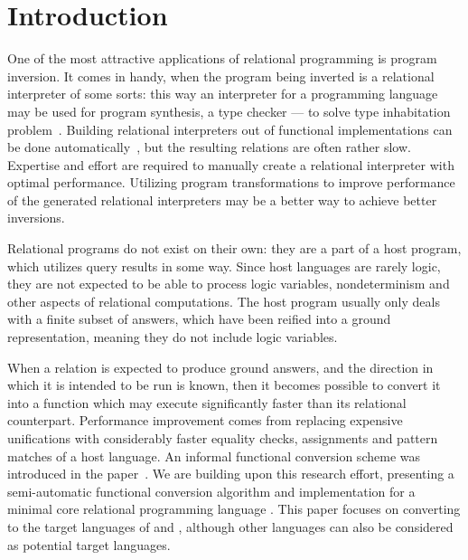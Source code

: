 \section{Introduction}
One of the most attractive applications of relational programming is program inversion.
It comes in handy, when the program being inverted is a relational interpreter of some sorts: this way an interpreter for a programming language may be used for program synthesis, a type checker --- to solve type inhabitation problem~\cite{lozov2019relational}.
Building relational interpreters out of functional implementations can be done automatically~\cite{lozov2018typed}, but the resulting relations are often rather slow.
Expertise and effort are required to manually create a relational interpreter with optimal performance.
Utilizing program transformations to improve performance of the generated relational interpreters may be a better way to achieve better inversions.

Relational programs do not exist on their own: they are a part of a host program, which utilizes query results in some way.
Since host languages are rarely logic, they are not expected to be able to process logic variables, nondeterminism and other aspects of relational computations.
The host program usually only deals with a finite subset of answers, which have been reified into a ground representation, meaning they do not include logic variables.

When a relation is expected to produce ground answers, and the direction in which it is intended to be run is known, then it becomes possible to convert it into a function which may execute significantly faster than its relational counterpart.
Performance improvement comes from replacing expensive unifications with considerably faster equality checks, assignments and pattern matches of a host language.
An informal functional conversion scheme was introduced in the paper~\cite{verbitskaia2022direction}.
We are building upon this research effort, presenting a semi-automatic functional conversion algorithm and implementation for a minimal core relational programming language \micro.
This paper focuses on converting to the target languages of \haskell and \ocaml, although other languages can also be considered as potential target languages.

